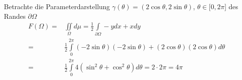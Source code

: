 \begin{enumerate}
Betrachte die Parameterdarstellung $\gamma\left(\theta\right)=\left( 2\cos\theta,2\sin\theta\right)$, $\theta\in\lbrack 0,2\pi\rbrack$ des Randes $\partial\Omega$
\begin{align*}
F\left(\Omega\right)=&\iint\limits_\Omega d\mu = \frac{1}{2}\int\limits_{\partial\Omega} -ydx+xdy\\
=&\frac{1}{2}\int\limits_0^{2\pi}\left( -2\sin\theta\right)\left( -2\sin\theta\right) + \left( 2\cos\theta\right)\left( 2\cos\theta\right) d\theta\\
=&\frac{1}{2}\int\limits_0^{2\pi}4\left( \sin^2\theta+\cos^2\theta\right)d\theta=2\cdot 2\pi=4\pi
\end{align*}
\end{enumerate}